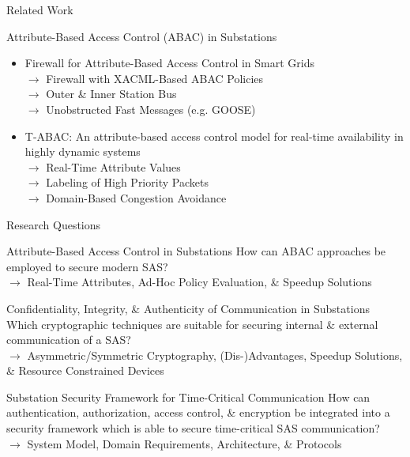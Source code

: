 \documentclass[en]{sdqbeamer}
\begin{document}
\begin{frame}{Related Work}
    \begin{blueblock}{Attribute-Based Access Control (ABAC) in Substations}
        \begin{itemize}
            \item Firewall for Attribute-Based Access Control in Smart Grids \parencite{Ruland2018}
            \\$\rightarrow$ Firewall with XACML-Based ABAC Policies
            \\$\rightarrow$ Outer \& Inner Station Bus
            \\$\rightarrow$ Unobstructed Fast Messages (e.g. GOOSE)
            \item T-ABAC: An attribute-based access control model for real-time availability in highly dynamic systems \parencite{Burmester2013}
            \\$\rightarrow$ Real-Time Attribute Values
            \\$\rightarrow$ Labeling of High Priority Packets
            \\$\rightarrow$ Domain-Based Congestion Avoidance
        \end{itemize}
    \end{blueblock}
\end{frame}

\begin{frame}{Research Questions}
    \begin{greenblock}{Attribute-Based Access Control in Substations}
        How can ABAC approaches be employed to secure modern SAS?
        \\$\rightarrow$ Real-Time Attributes, Ad-Hoc Policy Evaluation, \& Speedup Solutions
    \end{greenblock}

    \begin{greenblock}{Confidentiality, Integrity, \& Authenticity of Communication in Substations}
        Which cryptographic techniques are suitable for securing internal \& external communication of a SAS?
        \\$\rightarrow$ Asymmetric/Symmetric Cryptography, (Dis-)Advantages, Speedup Solutions, \& Resource Constrained Devices
    \end{greenblock}

    \begin{greenblock}{Substation Security Framework for Time-Critical Communication}
        How can authentication, authorization, access control, \& encryption be integrated into a security framework which is able to secure time-critical SAS communication?
        \\$\rightarrow$ System Model, Domain Requirements, Architecture, \& Protocols
    \end{greenblock}
\end{frame}
\end{document}
